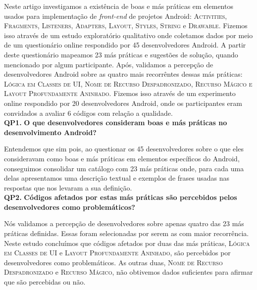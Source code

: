 
Neste artigo investigamos a existência de boas e más práticas em elementos usados para implementação de \textit{front-end} de projetos Android: \textsc{Activities}, \textsc{Fragments}, \textsc{Listeners}, \textsc{Adapters}, \textsc{Layout}, \textsc{Styles}, \textsc{String} e \textsc{Drawable}. Fizemos isso através de um estudo exploratório qualitativo onde coletamos dados por meio de um questionário online respondido por 45 desenvolvedores Android. A partir deste questionário mapeamos 23 más práticas e sugestões de solução, quando mencionado por algum participante. Após, validamos a percepção de desenvolvedores Android sobre as quatro mais recorrêntes dessas más práticas: \textsc{Lógica em Classes de UI}, \textsc{Nome de Recurso Despadronizado}, \textsc{Recurso Mágico e Layout Profundamente Aninhado}. Fizemos isso através de um experimento online respondido por 20 desenvolvedores Android, onde os participantes eram convidados a avaliar 6 códigos com relação a qualidade. \\

\textbf{QP1.} \textbf{O que desenvolvedores consideram boas e más práticas no desenvolvimento Android?} 

Entendemos que sim pois, ao questionar os 45 desenvolvedores sobre o que eles consideravam como boas e más práticas em elementos específicos do Android, conseguimos consolidar um catálogo com 23 más práticas onde, para cada uma delas apresentamos uma descrição textual e exemplos de frases usadas nas respostas que nos levaram a sua definição. \\

\textbf{QP2.} \textbf{Códigos afetados por estas más práticas são percebidos pelos desenvolvedores como problemáticos?}

Nós validamos a percepção de desenvolvedores sobre apenas quatro das 23 más práticas definidas. Essas foram selecionadas por serem as com maior recorrência. Neste estudo concluímos que códigos afetados por duas das más práticas, \textsc{Lógica em Classes de UI} e \textsc{Layout Profundamente Aninhado}, são percebidos por desenvolvedores como problemáticos. As outras duas, \textsc{Nome de Recurso Despadronizado} e \textsc{Recurso Mágico}, não obtivemos dados suficientes para afirmar que são percebidas ou não.




